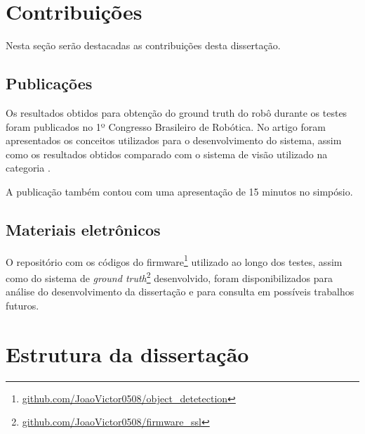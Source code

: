 \documentclass[acronym, symbols, table, deposito]{fei}
\begin{document}
	\section{Contribuições}
	
		Nesta seção serão destacadas as contribuições desta dissertação.
		
		\subsection{Publicações}
		
			Os resultados obtidos para obtenção do ground truth do robô durante os testes foram publicados no 1º Congresso Brasileiro de Robótica. No artigo foram apresentados os conceitos utilizados para o desenvolvimento do sistema, assim como os resultados obtidos comparado com o sistema de visão utilizado na categoria .
			
			A publicação também contou com uma apresentação de 15 minutos no simpósio.
			
		\subsection{Materiais eletrônicos}
		
			O repositório com os códigos do firmware\footnote{\href{https://github.com/JoaoVictor0508/object_detetection/tree/main}{github.com/JoaoVictor0508/object\_detetection}} utilizado ao longo dos testes, assim como do sistema de \textit{ground truth}\footnote{\href{https://github.com/JoaoVictor0508/firmware_ssl}{github.com/JoaoVictor0508/firmware\_ssl}} desenvolvido, foram disponibilizados para análise do desenvolvimento da dissertação e para consulta em possíveis trabalhos futuros.
	
	\section{Estrutura da dissertação}
	
\end{document}
